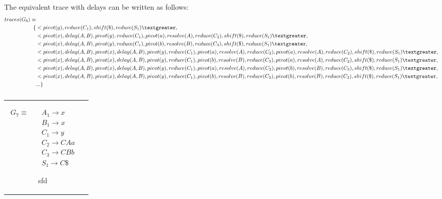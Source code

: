 \documentclass[11pt]{article}
\begin{document}
The equivalent trace with delays can be written as follows:
\begin{align*}
traces(G_6) \equiv \\
\{ & \textless pivot(y), reduce(C_1), shift(\$), reduce(S_1) \textgreater,\\
                      & \textless pivot(x), delay(A,B), pivot(y), reduce(C_1), pivot(a), resolve(A), reduce(C_2), shift(\$), reduce(S_1) \textgreater,\\
                      & \textless pivot(x), delay(A,B), pivot(y), reduce(C_1), pivot(b), resolve(B), reduce(C_3), shift(\$), reduce(S_1) \textgreater,\\
                      & \textless pivot(x), delay(A,B), pivot(x), delay(A,B), pivot(y), reduce(C_1), pivot(a), resolve(A), reduce(C_2), pivot(a), resolve(A), reduce(C_2), shift(\$), reduce(S_1) \textgreater,\\
                      & \textless pivot(x), delay(A,B), pivot(x), delay(A,B), pivot(y), reduce(C_1), pivot(b), resolve(B), reduce(C_3), pivot(a), resolve(A), reduce(C_2), shift(\$), reduce(S_1) \textgreater,\\
                      & \textless pivot(x), delay(A,B), pivot(x), delay(A,B), pivot(y), reduce(C_1), pivot(a), resolve(A), reduce(C_2), pivot(b), resolve(B), reduce(C_3), shift(\$), reduce(S_1) \textgreater,\\
                      & \textless pivot(x), delay(A,B), pivot(x), delay(A,B), pivot(y), reduce(C_1), pivot(b), resolve(B), reduce(C_3), pivot(b), resolve(B), reduce(C_3), shift(\$), reduce(S_1) \textgreater,\\
                      & ... \}
\end{align*}

\subsubsection{}
\begin{tabular}[t]{cl}
\parbox{.3\textwidth}{
\begin{align*}
G_7 \equiv \quad & A_1 \rightarrow x\\
                 & B_1 \rightarrow x\\
                 & C_1 \rightarrow y\\
                 & C_2 \rightarrow C A a\\
                 & C_3 \rightarrow C B b\\
                 & S_1 \rightarrow C \$
\end{align*}}
\parbox{.8\textwidth}{sfd}
\end{tabular}
\end{document}
